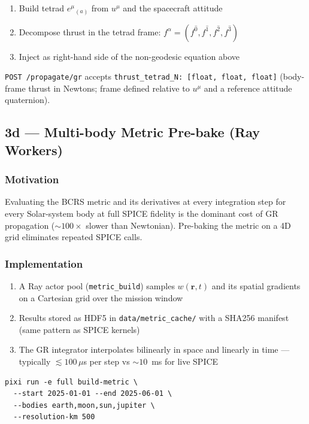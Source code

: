 \documentclass[11pt, a4paper]{article}
\begin{document}
\begin{enumerate}[noitemsep]
  \item Build tetrad $e^\mu{}_{(a)}$ from $u^\mu$ and the spacecraft attitude
  \item Decompose thrust in the tetrad frame:
        $f^\alpha = (f^{\hat{0}}, f^{\hat{1}}, f^{\hat{2}}, f^{\hat{3}})$
  \item Inject as right-hand side of the non-geodesic equation above
\end{enumerate}

\texttt{POST /propagate/gr} accepts \texttt{thrust\_tetrad\_N: [float, float, float]}
(body-frame thrust in Newtons; frame defined relative to $u^\mu$ and a
reference attitude quaternion).

\subsection{3d — Multi-body Metric Pre-bake (Ray Workers)}

\subsubsection{Motivation}

Evaluating the BCRS metric and its derivatives at every integration step for
every Solar-system body at full SPICE fidelity is the dominant cost of GR
propagation (${\sim}100\times$ slower than Newtonian). Pre-baking the metric
on a 4D grid eliminates repeated SPICE calls.

\subsubsection{Implementation}

\begin{enumerate}[noitemsep]
  \item A Ray actor pool (\texttt{metric\_build}) samples $w(\mathbf{r}, t)$
        and its spatial gradients on a Cartesian grid over the mission window
  \item Results stored as HDF5 in \texttt{data/metric\_cache/} with a
        SHA256 manifest (same pattern as SPICE kernels)
  \item The GR integrator interpolates bilinearly in space and linearly in time
        — typically ${\lesssim}100\,\mu$s per step vs ${\sim}10$~ms for live SPICE
\end{enumerate}

\begin{verbatim}
pixi run -e full build-metric \
  --start 2025-01-01 --end 2025-06-01 \
  --bodies earth,moon,sun,jupiter \
  --resolution-km 500
\end{verbatim}
\end{document}
